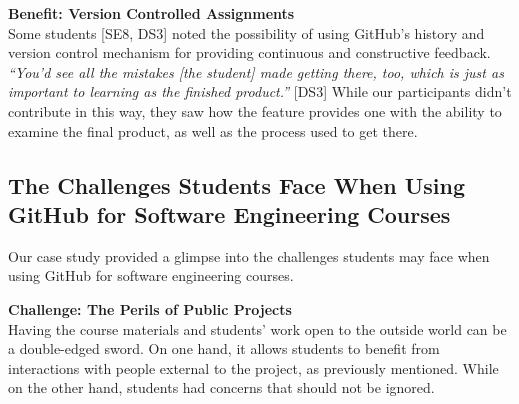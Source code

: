\textbf{Benefit: Version Controlled Assignments}\\
%
Some students [SE8, DS3] noted the possibility of using GitHub's history and version control mechanism for providing continuous and constructive feedback. \textit{``You'd see all the mistakes [the student] made getting there, too, which is just as important to learning as the finished product.''} [DS3] While our participants didn't contribute in this way, they saw how the feature provides one with the ability to examine the final product, as well as the process used to get there.

\subsection{The Challenges Students Face When Using GitHub for Software Engineering Courses}
Our case study provided a glimpse into the challenges students may face when using GitHub for software engineering courses.

\textbf{Challenge: The Perils of Public Projects}\\
Having the course materials and students' work open to the outside world can be a double-edged sword. On one hand, it allows students to benefit from interactions with people external to the project, as previously mentioned. While on the other hand, students had concerns that should not be ignored.

